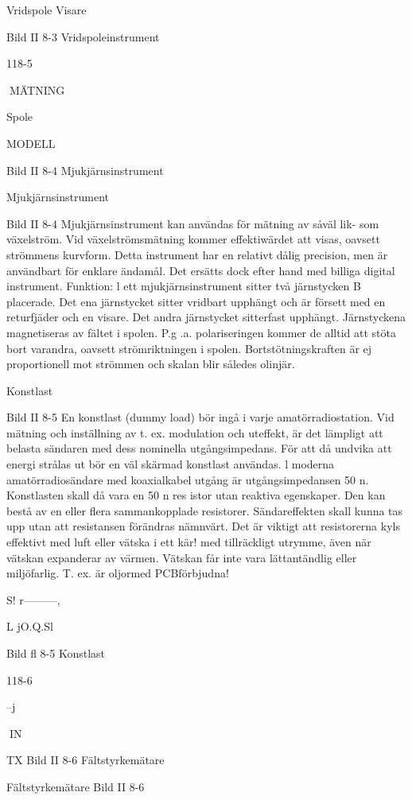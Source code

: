 \documentclass[a4paper,twoside,twocolumn,openright]{book}
\begin{document}
{{{{{Vridspole
Visare\

Bild II 8-3 Vridspoleinstrument

118-5

MÄTNING

Spole

MODELL

Bild II 8-4 Mjukjärnsinstrument

Mjukjärnsinstrument

Bild II 8-4
Mjukjärnsinstrument kan användas för mätning av såväl lik- som växelström. Vid växelströmsmätning kommer effektiwärdet att
visas, oavsett strömmens kurvform.
Detta instrument har en relativt dålig precision, men är användbart för enklare ändamål. Det ersätts dock efter hand med billiga
digital instrument.
Funktion: l ett mjukjärnsinstrument sitter
två järnstycken B placerade. Det ena järnstycket sitter vridbart upphängt och är försett
med en returfjäder och en visare. Det andra
järnstycket sitterfast upphängt. Järnstyckena
magnetiseras av fältet i spolen. P.g .a. polariseringen kommer de alltid att stöta bort
varandra, oavsett strömriktningen i spolen.
Bortstötningskraften är ej proportionell mot
strömmen och skalan blir således olinjär.

Konstlast

Bild II 8-5
En konstlast (dummy load) bör ingå i varje
amatörradiostation. Vid mätning och inställning av t. ex. modulation och uteffekt, är det
lämpligt att belasta sändaren med dess nominella utgångsimpedans. För att då undvika att energi strålas ut bör en väl skärmad
konstlast användas.
l moderna amatörradiosändare med koaxialkabel utgång är utgångsimpedansen 50
n. Konstlasten skall då vara en 50 n res istor
utan reaktiva egenskaper. Den kan bestå av
en eller flera sammankopplade resistorer.
Sändareffekten skall kunna tas upp utan
att resistansen förändras nämnvärt. Det är
viktigt att resistorerna kyls effektivt med luft
eller vätska i ett kär! med tillräckligt utrymme, även när vätskan expanderar av värmen. Vätskan får inte vara lättantändlig eller
miljöfarlig. T. ex. är oljormed PCBförbjudna!

S!
r---------,

L  jO.Q.Sl

Bild fl 8-5 Konstlast

118-6

--j

IN

TX
Bild II 8-6 Fältstyrkemätare

Fältstyrkemätare
Bild II 8-6

}}}}}
\end{document}
